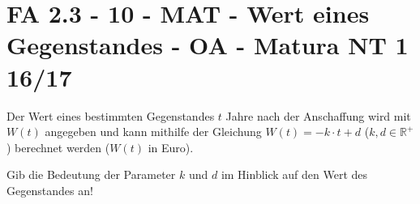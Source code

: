 \section{FA 2.3 - 10 - MAT - Wert eines Gegenstandes - OA - Matura NT 1 16/17}

\begin{beispiel}[FA 2.3]{1} %
Der Wert eines bestimmten Gegenstandes $t$ Jahre nach der Anschaffung wird mit $W(t)$ angegeben und kann mithilfe der Gleichung $W(t)=-k\cdot t+d$ ($k,d\in\mathbb{R}^+$) berechnet werden ($W(t)$ in Euro).

Gib die Bedeutung der Parameter $k$ und $d$ im Hinblick auf den Wert des Gegenstandes an!

\end{beispiel}